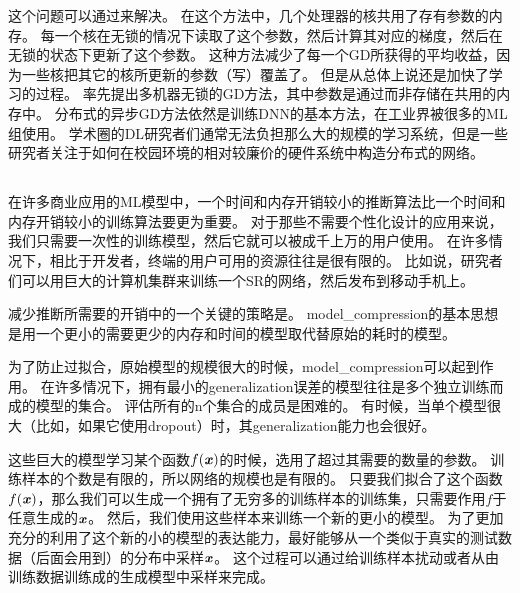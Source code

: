 这个问题可以通过\citep{Bengio+Bengio96,Recht-et-al-NIPS2011}来解决。
在这个方法中，几个处理器的核共用了存有参数的内存。
每一个核在无锁的情况下读取了这个参数，然后计算其对应的梯度，然后在无锁的状态下更新了这个参数。
这种方法减少了每一个\gls{GD}所获得的平均收益，因为一些核把其它的核所更新的参数（写）覆盖了。
但是从总体上说还是加快了学习的过程。
\citet{Dean-et-al-NIPS2012}率先提出多机器无锁的\gls{GD}方法，其中参数是通过而非存储在共用的内存中。
分布式的异步\gls{GD}方法依然是训练\gls{DNN}的基本方法，在工业界被很多的\gls{ML}组使用\citep{chilimbi2014project,Wu-et-al-arXiv2015}。
学术圈的\gls{DL}研究者们通常无法负担那么大的规模的学习系统，但是一些研究者关注于如何在校园环境的相对较廉价的硬件系统中构造分布式的网络\citep{icml2013_coates13}。


\subsection{}
\label{sec:model_compression}

在许多商业应用的\gls{ML}模型中，一个时间和内存开销较小的推断算法比一个时间和内存开销较小的训练算法要更为重要。
对于那些不需要个性化设计的应用来说，我们只需要一次性的训练模型，然后它就可以被成千上万的用户使用。
在许多情况下，相比于开发者，终端的用户可用的资源往往是很有限的。
比如说，研究者们可以用巨大的计算机集群来训练一个\gls{SR}的网络，然后发布到移动手机上。


减少推断所需要的开销中的一个关键的策略是\citep{bucilua2006model}。
\gls{model_compression}的基本思想是用一个更小的需要更少的内存和时间的模型取代替原始的耗时的模型。



为了防止过拟合，原始模型的规模很大的时候，\gls{model_compression}可以起到作用。
在许多情况下，拥有最小的\gls{generalization}误差的模型往往是多个独立训练而成的模型的集合。
评估所有的n个集合的成员是困难的。
有时候，当单个模型很大（比如，如果它使用\gls{dropout}）时，其\gls{generalization}能力也会很好。

这些巨大的模型学习某个函数$f(\boldsymbol{\mathit{x}})$的时候，选用了超过其需要的数量的参数。
训练样本的个数是有限的，所以网络的规模也是有限的。
只要我们拟合了这个函数$f(\boldsymbol{\mathit{x}})$，那么我们可以生成一个拥有了无穷多的训练样本的训练集，只需要作用$f$于任意生成的$\boldsymbol{\mathit{x}}$。
然后，我们使用这些样本来训练一个新的更小的模型。
为了更加充分的利用了这个新的小的模型的表达能力，最好能够从一个类似于真实的测试数据（后面会用到）的分布中采样$\boldsymbol{\mathit{x}}$。
这个过程可以通过给训练样本扰动或者从由训练数据训练成的生成模型中采样来完成。

